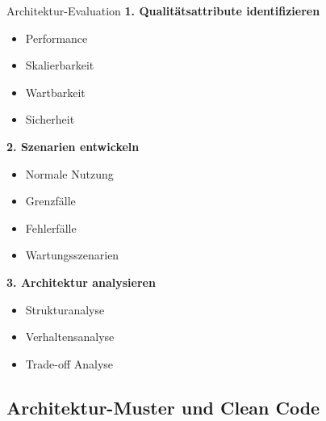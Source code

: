 \begin{KR}{Architektur-Evaluation}
\textbf{1. Qualitätsattribute identifizieren}
\begin{itemize}
    \item Performance
    \item Skalierbarkeit
    \item Wartbarkeit
    \item Sicherheit
\end{itemize}

\textbf{2. Szenarien entwickeln}
\begin{itemize}
    \item Normale Nutzung
    \item Grenzfälle
    \item Fehlerfälle
    \item Wartungsszenarien
\end{itemize}

\textbf{3. Architektur analysieren}
\begin{itemize}
    \item Strukturanalyse
    \item Verhaltensanalyse
    \item Trade-off Analyse
\end{itemize}
\end{KR}


\subsection{Architektur-Muster und Clean Code}

